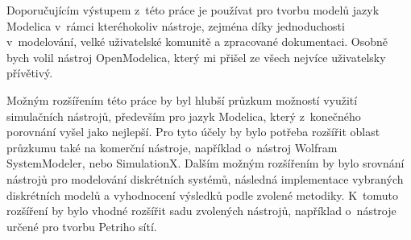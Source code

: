 Doporučujícím výstupem z~této práce je používat pro tvorbu modelů jazyk Modelica v~rámci kteréhokoliv nástroje, zejména díky jednoduchosti v~modelování, velké uživatelské komunitě a zpracované dokumentaci. Osobně bych volil nástroj OpenModelica, který mi přišel ze všech nejvíce uživatelsky přívětivý.

Možným rozšířením této práce by byl hlubší průzkum možností využití simulačních nástrojů, především pro jazyk Modelica, který z~konečného porovnání vyšel jako nejlepší. Pro tyto účely by bylo potřeba rozšířit oblast průzkumu také na komerční nástroje, například o~nástroj Wolfram SystemModeler, nebo SimulationX. Dalším možným rozšířením by bylo srovnání nástrojů pro modelování diskrétních systémů, následná implementace vybraných diskrétních modelů a vyhodnocení výsledků podle zvolené metodiky. K~tomuto rozšíření by bylo vhodné rozšířit sadu zvolených nástrojů, například o~nástroje určené pro tvorbu Petriho sítí. 



